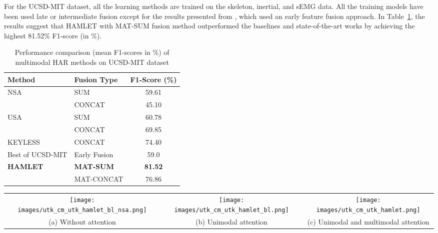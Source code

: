\documentclass[runningheads]{llncs}
\newcommand{\pa}{HAMLET}
\begin{document}
\par For the UCSD-MIT dataset, all the learning methods are trained on the skeleton, inertial, and sEMG data. All the training models have been used late or intermediate fusion except for the results presented from \cite{mit_ucsd}, which used an early feature fusion approach. In Table~\ref{tab:com_on_mit_ucsd}, the results suggest that {\pa } with MAT-SUM fusion method outperformed the baselines and state-of-the-art works by achieving the highest 81.52\% F1-score (in \%).  

\begin{table}[!t]
    \centering
    \caption{Performance comparison (mean F1-scores in \%) of multimodal HAR methods on UCSD-MIT dataset \cite{mit_ucsd}}
    \label{tab:com_on_mit_ucsd}
    \begin{tabular}{llc}
        \toprule
        \multirow{1}{*}{Method} & Fusion Type &  F1-Score (\%) \\
        \hline
        \multirow{2}{*}{NSA} & SUM & 59.61\\
& CONCAT & 45.10\\
        \hline
        \multirow{2}{*}{USA} & SUM & 60.78\\
& CONCAT & 69.85\\
        \hline
        \multirow{1}{*}{{KEYLESS \cite{keyless}}} (2018) & CONCAT & 74.40\\
        \hline
        \multirow{1}{*}{{Best of UCSD-MIT\cite{mit_ucsd}}} (2019) & Early Fusion & 59.0 \\
        \hline
        \multirow{2}{*}{\textbf{\pa}} & \textbf{MAT-SUM} & \textbf{81.52}\\
& MAT-CONCAT & 76.86\\
        \bottomrule
    \end{tabular}
     \vspace{-0.2in}
\end{table}



\begin{figure*}[!t]
  \centering
  \begin{tabular}{*{3}{c}}
    \texttt{[image: images/utk\_cm\_utk\_hamlet\_bl\_nsa.png]} &
    \texttt{[image: images/utk\_cm\_utk\_hamlet\_bl.png]} &
    \texttt{[image: images/utk\_cm\_utk\_hamlet.png]} \\
    \footnotesize{(a) Without attention} & \footnotesize{(b) Unimodal attention} & \footnotesize{(c) Unimodal and multimodal attention} \\
  \end{tabular}
  \caption{Comparative impact of multimodal and unimodal attention in {\pa } for different activities on UT-Kinect dataset.}
  \label{fig:com_cm}
\end{figure*}
\end{document}
